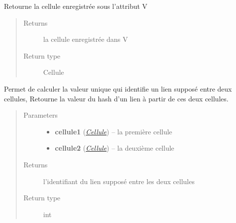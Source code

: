 \documentclass[letterpaper,10pt,english]{sphinxmanual}
\begin{document}
\begin{fulllineitems}
\begin{fulllineitems}
\begin{quote}
\begin{description}
\end{description}\end{quote}

\end{fulllineitems}


\begin{fulllineitems}
\label{index:Lien.Lien.getV}
Retourne la cellule enregistrée sous l'attribut V
\begin{quote}\begin{description}
\item[{Returns}] \leavevmode
la cellule enregistrée dans V

\item[{Return type}] \leavevmode
Cellule

\end{description}\end{quote}

\end{fulllineitems}


\begin{fulllineitems}
\label{index:Lien.Lien.hachage}
Permet de calculer la valeur unique qui identifie un lien supposé entre deux cellules, 
Retourne la valeur du hash d'un lien à partir de ces deux cellules.
\begin{quote}\begin{description}
\item[{Parameters}] \leavevmode\begin{itemize}
\item {} 
\textbf{cellule1} ({\hyperref[index:module-Cellule]{\emph{Cellule}}}) -- la première cellule

\item {} 
\textbf{cellule2} ({\hyperref[index:module-Cellule]{\emph{Cellule}}}) -- la deuxième cellule

\end{itemize}

\item[{Returns}] \leavevmode
l'identifiant du lien supposé entre les deux cellules

\item[{Return type}] \leavevmode
int

\end{description}\end{quote}


\end{fulllineitems}
\end{fulllineitems}
\end{document}

